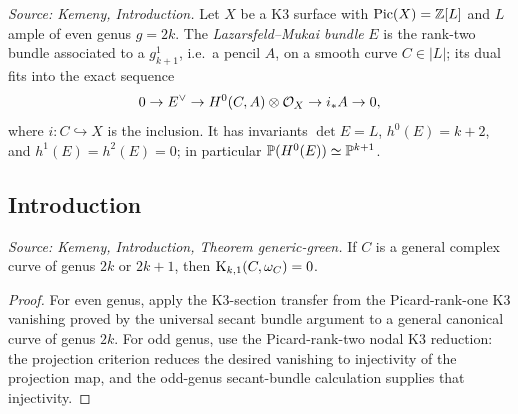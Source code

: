 \begin{definition}
  \label{def:kemeny_LM_bundle}
  \textit{Source: Kemeny, Introduction.}
  Let \(X\) be a K3 surface with \(\mathrm{Pic}(X)=\mathbb Z[L]\) and \(L\) ample of even
  genus \(g=2k\).  The \emph{Lazarsfeld--Mukai bundle} \(E\) is the rank-two
  bundle associated to a \(g^1_{k+1}\), i.e.\ a pencil \(A\), on a smooth curve
  \(C\in|L|\); its dual fits into the exact sequence
  \[
    0\to E^\vee\to H^0(C,A)\otimes\mathcal{O}_X\to i_*A\to0 ,
  \]
  where \(i:C\hookrightarrow X\) is the inclusion.  It has invariants
  \(\det E=L\), \(h^0(E)=k+2\), and \(h^1(E)=h^2(E)=0\); in particular
  \(\mathbb{P}(H^0(E))\simeq\mathbb{P}^{k+1}\).
\end{definition}

\subsection{Introduction}

\begin{theorem}
  \label{thm:kemeny_generic_green}
  \textit{Source: Kemeny, Introduction, Theorem generic-green.}
  If \(C\) is a general complex curve of genus \(2k\) or \(2k+1\), then
  \(\mathrm{K}_{k,1}(C,\omega_C)=0\).
\end{theorem}
\begin{proof}
  For even genus, apply the K3-section transfer from the Picard-rank-one K3
  vanishing proved by the universal secant bundle argument to a general
  canonical curve of genus \(2k\).
  For odd genus, use the Picard-rank-two nodal K3 reduction: the projection
  criterion reduces the desired vanishing to injectivity of the projection map,
  and the odd-genus secant-bundle calculation supplies that injectivity.
\end{proof}

